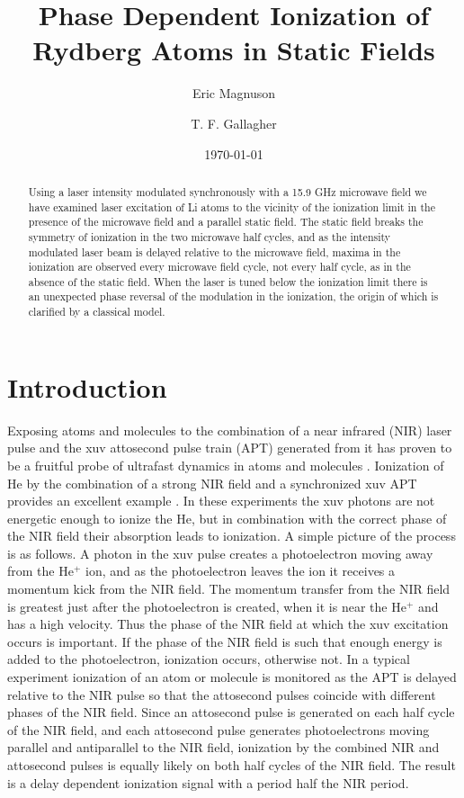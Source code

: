 \documentclass[aps,pra,preprint,groupedaddress]{revtex4-1}
\begin{document}
\title{Phase Dependent Ionization of Rydberg Atoms in Static Fields}
\author{Eric Magnuson}
\author{T. F. Gallagher}
\date{\today}


\begin{abstract}
Using a laser intensity modulated synchronously with a 15.9 GHz microwave field we have examined laser excitation of Li atoms to the vicinity of the ionization limit in the presence of the microwave field and a parallel static field. The static field breaks the symmetry of ionization in the two microwave half cycles, and as the intensity modulated laser beam is delayed relative to the microwave field, maxima in the ionization are observed every microwave field cycle, not every half cycle, as in the absence of the static field. When the laser is tuned below the ionization limit there is an unexpected phase reversal of the modulation in the ionization, the origin of which is clarified by a classical model.
\end{abstract}


\pacs{}


\maketitle


\section{\label{sec:intro}Introduction}


Exposing atoms and molecules to the combination of a near infrared (NIR) laser pulse and the xuv attosecond pulse train (APT) generated from it has proven to be a fruitful probe of ultrafast dynamics in atoms and molecules \cite{Krausz}. Ionization of He by the combination of a strong NIR field and a synchronized xuv APT provides an excellent example \cite{Johnsson, Ranitovic, Tong}.  In these experiments the xuv photons are not energetic enough to ionize the He, but in combination with the correct phase of the NIR field their absorption leads to ionization. A simple picture of the process is as follows. A photon in the xuv pulse creates a photoelectron moving away from the He$^+$ ion, and as the photoelectron leaves the ion it receives a momentum kick from the NIR field. The momentum transfer from the NIR field is greatest just after the photoelectron is created, when it is near the He$^+$ and has a high velocity. Thus the phase of the NIR field at which the xuv excitation occurs is important. If the phase of the NIR field is such that enough energy is added to the photoelectron, ionization occurs, otherwise not. In a typical experiment ionization of an atom or molecule is monitored as the APT is delayed relative to the NIR pulse so that the attosecond pulses coincide with different phases of the NIR field. Since an attosecond  pulse is generated on each half cycle of the NIR field, and each attosecond pulse generates photoelectrons moving parallel and antiparallel to the NIR field, ionization by the combined NIR and attosecond pulses is equally likely on both half cycles of the NIR field. The result is a delay dependent ionization signal with a period half the NIR period.
\end{document}
